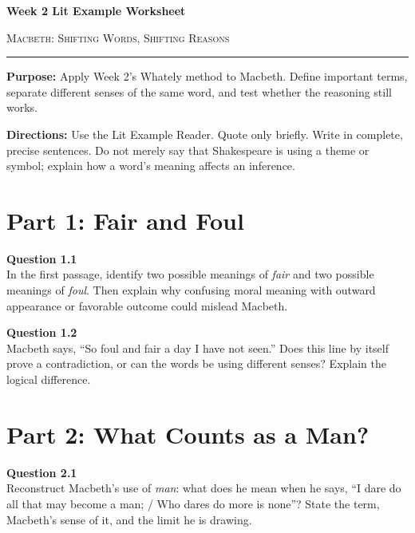 \documentclass[12pt]{article}
\begin{document}
\begin{center}
{\LARGE\bfseries Week 2 Lit Example Worksheet}\par\vspace{0.05em}
{\large\scshape Macbeth: Shifting Words, Shifting Reasons}\par\vspace{0.12em}
\rule{0.78\textwidth}{0.5pt}
\end{center}

\textbf{Purpose:} Apply Week 2's Whately method to Macbeth. Define important terms, separate different senses of the same word, and test whether the reasoning still works.

\textbf{Directions:} Use the Lit Example Reader. Quote only briefly. Write in complete, precise sentences. Do not merely say that Shakespeare is using a theme or symbol; explain how a word's meaning affects an inference.

\section*{Part 1: Fair and Foul}

\textbf{Question 1.1}\\[-0.15em]
In the first passage, identify two possible meanings of \textit{fair} and two possible meanings of \textit{foul}. Then explain why confusing moral meaning with outward appearance or favorable outcome could mislead Macbeth.


\newpage

\textbf{Question 1.2}\\[-0.15em]
Macbeth says, ``So foul and fair a day I have not seen.'' Does this line by itself prove a contradiction, or can the words be using different senses? Explain the logical difference.


\newpage

\section*{Part 2: What Counts as a Man?}

\textbf{Question 2.1}\\[-0.15em]
Reconstruct Macbeth's use of \textit{man}: what does he mean when he says, ``I dare do all that may become a man; / Who dares do more is none''? State the term, Macbeth's sense of it, and the limit he is drawing.
\end{document}
